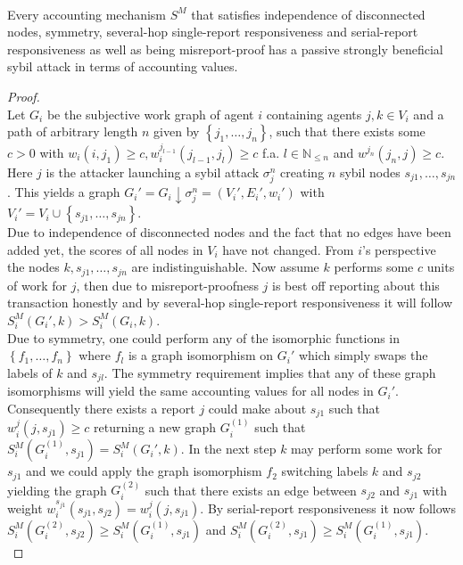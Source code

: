 \begin{theorem}[]\ \\
\label{th:Serial-Report Responsiveness Sybil Attack}
\noindent{}Every accounting mechanism $S^M$ that satisfies independence of disconnected nodes, symmetry, several-hop single-report responsiveness and serial-report responsiveness as well as being misreport-proof has a passive strongly beneficial sybil attack in terms of accounting values. 
\end{theorem}
\begin{proof}\ \\
Let $G_i$ be the subjective work graph of agent $i$ containing agents $j,k\in{}V_i$ and a path of arbitrary length $n$ given by $\left\lbrace{}j_1,\ldots,j_n\right\rbrace$, such that there exists some $c>0$ with $w_i(i,j_1)\geq{}c,w_i^{j_{l-1}}(j_{l-1},j_l)\geq{}c$ f.a. $l\in\mathbb{N}_{\leq{}n}$ and $w^{j_n}(j_n,j)\geq{}c$. Here $j$ is the attacker launching a sybil attack $\sigma_j^n$ creating $n$ sybil nodes $s_{j1},\ldots,s_{jn}$. This yields a graph $G_i'=G_i\downarrow\sigma_j^n=(V_i',E_i',w_i')$ with $V_i'=V_i\cup\left\lbrace{}s_{j1},\ldots,s_{jn}\right\rbrace$. \vspace{1em}\\

\noindent{}Due to independence of disconnected nodes and the fact that no edges have been added yet, the scores of all nodes in $V_i$ have not changed. From $i$'s perspective the nodes $k,s_{j1},\ldots,s_{jn}$ are indistinguishable. Now assume $k$ performs some $c$ units of work for $j$, then due to misreport-proofness $j$ is best off reporting about this transaction honestly and by several-hop single-report responsiveness it will follow $S_i^M(G_i',k)>S^M_i(G_i,k)$.\vspace{1em}\\

\noindent{}Due to symmetry, one could perform any of the isomorphic functions in $\left\lbrace{}f_1,\ldots,f_n\right\rbrace$ where $f_l$ is a graph isomorphism on $G_i'$ which simply swaps the labels of $k$ and $s_{jl}$. The symmetry requirement implies that any of these graph isomorphisms will yield the same accounting values for all nodes in $G_i'$. Consequently there exists a report $j$ could make about $s_{j1}$ such that $w_i^j(j,s_{j1})\geq{}c$ returning a new graph $G_i^{(1)}$ such that $S^M_i(G_i^{(1)},s_{j1})=S^M_i(G_i',k)$. In the next step $k$ may perform some work for $s_{j1}$ and we could apply the graph isomorphism $f_2$ switching labels $k$ and $s_{j2}$ yielding the graph $G_i^{(2)}$ such that there exists an edge between $s_{j2}$ and $s_{j1}$ with weight $w_i^{s_{j1}}(s_{j1},s_{j2})=w_i^j(j,s_{j1})$. By serial-report responsiveness it now follows $S^M_i(G_i^{(2)},s_{j2}) \geq S^M_i(G_i^{(1)},s_{j1})$ and $S^M_i(G_i^{(2)},s_{j1})\geq{}S^M_i(G_i^{(1)},s_{j1})$.\vspace{1em}\\


\end{proof}
